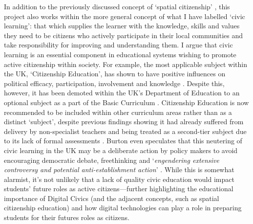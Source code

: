 In addition to the previously discussed concept of `spatial citizenship' \citep{Gryl2012}, this project also works within the more general concept of what I have labelled `civic learning': that which supplies the learner with the knowledge, skills and values they need to be citizens who actively participate in their local communities and take responsibility for improving and understanding them. I argue that civic learning is an essential component in educational systems wishing to promote active citizenship within society. For example, the most applicable subject within the UK, `Citizenship Education', has shown to have positive influences on political efficacy, participation, involvement and knowledge \citep{whiteley2012}. Despite this, however, it has been demoted within the UK’s Department of Education to an optional subject as a part of the Basic Curriculum \citep{GovEducation2011}. Citizenship Education is now recommended to be included within other curriculum areas rather than as a distinct `subject’, despite previous findings showing it had already suffered from delivery by non-specialist teachers and being treated as a second-tier subject due to its lack of formal assessments \citep{Burton2015, Ofsted2013}. Burton even speculates that this neutering of civic learning in the UK may be a deliberate action by policy makers to avoid encouraging democratic debate, freethinking and ‘\textit{engendering extensive controversy and potential anti-establishment action}’ \citep{Burton2015}. While this is somewhat alarmist, it's not unlikely that a lack of quality civic education would impact students' future roles as active citizens---further highlighting the educational importance of Digital Civics (and the adjacent concepts, such as spatial citizenship education) and how digital technologies can play a role in preparing students for their futures roles as citizens.

